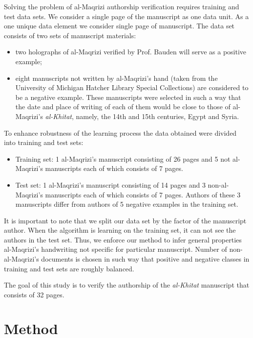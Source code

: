 \documentclass[conference,a4paper,twocolumn]{IEEEtran}
\begin{document}
Solving the problem of al-Maqrizi authorship verification requires training and test data sets. 
We consider a single page of the manuscript as one data unit.
As a one unique data element we consider single page of manuscript. The data set consists of two sets of manuscript materials:
\begin{itemize}
	\item two holographs of al-Maqrizi verified by Prof. Bauden will serve as a positive example;
	\item eight manuscripts not written by al-Maqrizi's hand  (taken from the University of Michigan Hatcher Library Special Collections) are considered to be a negative example. These manuscripts were selected in such a way that the date and place of writing of each of them would be close to those of al-Maqrizi's  \textit{al-Khitat}, namely, the 14th and 15th centuries, Egypt and Syria.
\end{itemize}

To enhance robustness of the learning process the data obtained were divided into training and test sets:
\begin{itemize}
	\item Training set: 1 al-Maqrizi's manuscript consisting of 26 pages and 5 not al-Maqrizi's manuscripts each of which consists of 7 pages.
	\item Test set: 1 al-Maqrizi's manuscript consisting of 14 pages and 3 non-al-Maqrizi's manuscripts each of which consists of 7 pages. Authors of these 3 manuscripts differ from authors of 5 negative examples in the training set.   
\end{itemize}

It is important to note that we split our data set by the factor of the manuscript author. When the algorithm is learning on the training set, it can not see the authors in the test set. Thus, we enforce our method to infer general properties al-Maqrizi's handwriting not specific for particular manuscript. Number of non-al-Maqrizi's documents is chosen in such way that positive and negative classes in training and test sets are roughly balanced.

The goal of this study is to verify the authorship of the \textit{al-Khitat} manuscript that consists of 32 pages.



\section{Method}
\label{sec:the_method}
\end{document}
